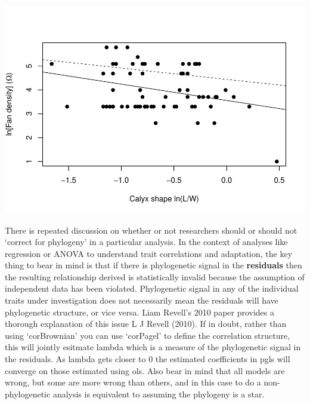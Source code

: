 \documentclass[]{article}
\newenvironment{Shaded}{\begin{snugshade}}{\end{snugshade}}
\newcommand{\KeywordTok}[1]{\textcolor[rgb]{0.13,0.29,0.53}{\textbf{#1}}}
\newcommand{\DataTypeTok}[1]{\textcolor[rgb]{0.13,0.29,0.53}{#1}}
\newcommand{\DecValTok}[1]{\textcolor[rgb]{0.00,0.00,0.81}{#1}}
\newcommand{\StringTok}[1]{\textcolor[rgb]{0.31,0.60,0.02}{#1}}
\newcommand{\OperatorTok}[1]{\textcolor[rgb]{0.81,0.36,0.00}{\textbf{#1}}}
\newcommand{\NormalTok}[1]{#1}
\begin{document}
\begin{Shaded}
\end{Shaded}

\includegraphics{module_08_files/figure-latex/unnamed-chunk-14-1.pdf}

There is repeated discussion on whether or not researchers should or
should not `correct for phylogeny' in a particular analysis. In the
context of analyses like regression or ANOVA to understand trait
correlations and adaptation, the key thing to bear in mind is that if
there is phylogenetic signal in the \textbf{residuals} then the
resulting relationship derived is statistically invalid because the
assumption of independent data has been violated. Phylogenetic signal in
any of the individual traits under investigation does not necessarily
mean the residuals will have phylogenetic structure, or vice versa. Liam
Revell's 2010 paper provides a thorough explanation of this issue L J
Revell (2010). If in doubt, rather than using `corBrownian' you can use
`corPagel' to define the correlation structure, this will jointly
esitmate lambda which is a measure of the phylogenetic signal in the
residuals. As lambda gets closer to 0 the estimated coefficients in pgls
will converge on those estimated using ols. Also bear in mind that all
models are wrong, but some are more wrong than others, and in this case
to do a non-phylogenetic analysis is equivalent to assuming the
phylogeny is a star.
\end{document}
